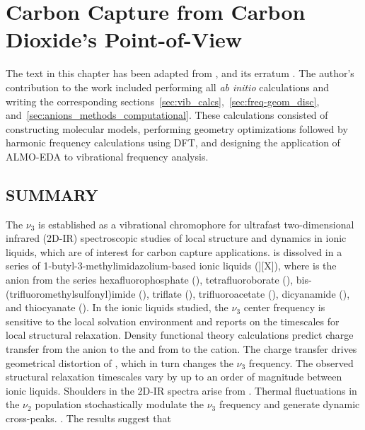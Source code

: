 \documentclass[%
  class = book,%
  crop = false,%
  float = true,%
  multi = true,%
  preview = false,%
]{standalone}
\newcommand{\caps}[1]{\uppercase{#1}}
\begin{document}
\chapter[\texorpdfstring{\ce{CO2}}{CO2}-IL Cluster Model Development]{Carbon Capture from Carbon Dioxide's Point-of-View}
\label{ch:anions}

The text in this chapter has been adapted from , and its erratum . The author's contribution to the work included performing all \textit{ab initio} calculations and writing the corresponding sections~\ref{sec:vib_calcs},~\ref{sec:freq-geom_disc}, and~\ref{sec:anions_methods_computational}. These calculations consisted of constructing molecular models, performing geometry optimizations followed by harmonic frequency calculations using DFT, and designing the application of ALMO-EDA to vibrational frequency analysis.

\section{\texorpdfstring{\caps{Summary}}{Summary}}
\label{sec:anions_summary}

The  \(\nu_3\) \href{https://chemistry.stackexchange.com/q/45138/194}{\color{black}{asymmetric stretching mode}} is established as a vibrational chromophore for ultrafast two-dimensional infrared (2D-IR) spectroscopic studies of local structure and dynamics in ionic liquids, which are of interest for carbon capture applications.  is dissolved in a series of 1-butyl-3-methylimidazolium-based ionic liquids (\ce{[Im_{4,1}}][X]), where \ce{[X]-} is the anion from the series hexafluorophosphate (), tetrafluoroborate (), bis-(trifluoromethylsulfonyl)imide (), triflate (), trifluoroacetate (), dicyanamide (), and thiocyanate (). In the ionic liquids studied, the \(\nu_3\) center frequency is sensitive to the local solvation environment and reports on the timescales for local structural relaxation. Density functional theory calculations predict charge transfer from the anion to the  and from  to the cation. The charge transfer drives geometrical distortion of , which in turn changes the \(\nu_3\) frequency. The observed structural relaxation timescales vary by up to an order of magnitude between ionic liquids. Shoulders in the 2D-IR spectra arise from . Thermal fluctuations in the \(\nu_2\) population stochastically modulate the \(\nu_3\) frequency and generate dynamic cross-peaks. . The results suggest that 
\end{document}
